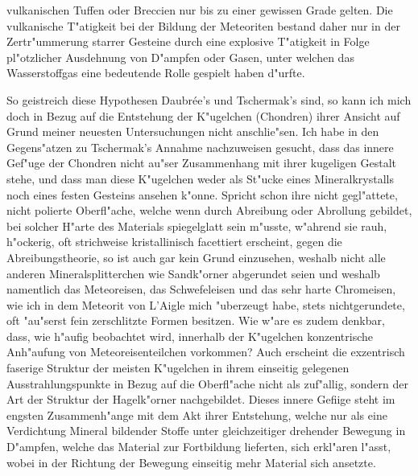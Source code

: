 \documentclass[a4paper, 11pt, oneside]{article}
\begin{document}
vulkanischen Tuffen oder Breccien nur bis zu einer gewissen Grade gelten. Die vulkanische T"atigkeit bei der Bildung der Meteoriten bestand daher nur in der Zertr"ummerung starrer Gesteine durch eine explosive T"atigkeit in Folge pl"otzlicher Ausdehnung von D"ampfen oder Gasen, unter welchen das Wasserstoffgas eine bedeutende Rolle gespielt haben d"urfte.

So geistreich diese Hypothesen Daubrée's und Tschermak's sind, so kann ich mich doch in Bezug auf die Entstehung der K"ugelchen (Chondren) ihrer Ansicht auf Grund meiner neuesten Untersuchungen nicht anschlie"sen. Ich habe in den Gegens"atzen zu Tschermak's Annahme nachzuweisen gesucht, dass das innere Gef"uge der Chondren nicht au"ser Zusammenhang mit ihrer kugeligen Gestalt stehe, und dass man diese K"ugelchen weder als St"ucke eines Mineralkrystalls noch eines festen Gesteins ansehen k"onne. Spricht schon ihre nicht gegl"attete, nicht polierte Oberfl"ache, welche wenn durch Abreibung oder Abrollung gebildet, bei solcher H"arte des Materials spiegelglatt sein m"usste, w"ahrend sie rauh, h"ockerig, oft strichweise kristallinisch facettiert erscheint, gegen die Abreibungstheorie, so ist auch gar kein Grund einzusehen, weshalb nicht alle anderen Mineralsplitterchen wie Sandk"orner abgerundet seien und weshalb namentlich das Meteoreisen, das Schwefeleisen und das sehr harte Chromeisen, wie ich in dem Meteorit von L'Aigle mich "uberzeugt habe, stets nichtgerundete, oft "au"serst fein zerschlitzte Formen besitzen. Wie w"are es zudem denkbar, dass, wie h"aufig beobachtet wird, innerhalb der K"ugelchen konzentrische Anh"aufung von Meteoreisenteilchen vorkommen? Auch erscheint die exzentrisch faserige Struktur der meisten K"ugelchen in ihrem einseitig gelegenen Ausstrahlungspunkte in Bezug auf die Oberfl"ache nicht als zuf"allig, sondern der Art der Struktur der Hagelk"orner nachgebildet. Dieses innere Gefiige steht im engsten Zusammenh"ange mit dem Akt ihrer Entstehung, welche nur als eine Verdichtung Mineral bildender Stoffe unter gleichzeitiger drehender Bewegung in D"ampfen, welche das Material zur Fortbildung lieferten, sich erkl"aren l"asst, wobei in der Richtung der Bewegung einseitig mehr Material sich ansetzte.
\end{document}
